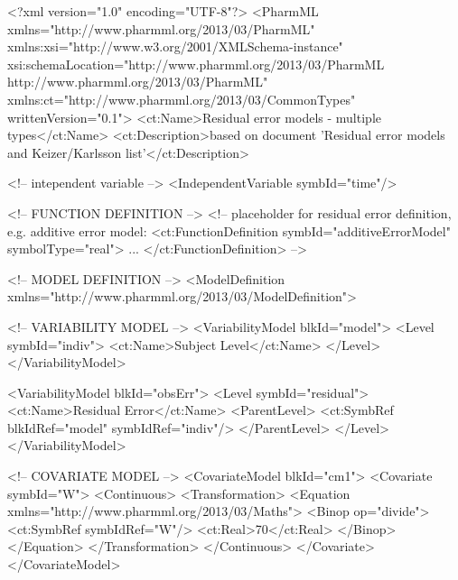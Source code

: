 \documentclass[a4paper,10pt]{article}
\begin{document}
\begin{xmlcode}
<?xml version="1.0" encoding="UTF-8"?>
<PharmML xmlns="http://www.pharmml.org/2013/03/PharmML"
    xmlns:xsi="http://www.w3.org/2001/XMLSchema-instance"
    xsi:schemaLocation="http://www.pharmml.org/2013/03/PharmML http://www.pharmml.org/2013/03/PharmML"
    xmlns:ct="http://www.pharmml.org/2013/03/CommonTypes"
    writtenVersion="0.1">
    <ct:Name>Residual error models - multiple types</ct:Name>
    <ct:Description>based on document 'Residual error models and Keizer/Karlsson list'</ct:Description>

    <!-- intependent variable -->
    <IndependentVariable symbId="time"/>

    <!-- FUNCTION DEFINITION -->
    <!-- placeholder for residual error definition, e.g. additive error model:
        <ct:FunctionDefinition symbId="additiveErrorModel" symbolType="real">
            ...
        </ct:FunctionDefinition>
    -->

    <!-- MODEL DEFINITION -->
    <ModelDefinition xmlns="http://www.pharmml.org/2013/03/ModelDefinition">
        
        <!-- VARIABILITY MODEL -->
        <VariabilityModel blkId="model">
            <Level symbId="indiv">
                <ct:Name>Subject Level</ct:Name>
            </Level>
        </VariabilityModel>
        
        <VariabilityModel blkId="obsErr">
            <Level symbId="residual">
                <ct:Name>Residual Error</ct:Name>
                <ParentLevel>
                    <ct:SymbRef blkIdRef="model" symbIdRef="indiv"/>
                </ParentLevel>
            </Level>
        </VariabilityModel>
        
        <!-- COVARIATE MODEL -->
        <CovariateModel blkId="cm1">
            <Covariate symbId="W">
                <Continuous>
                    <Transformation>
                        <Equation xmlns="http://www.pharmml.org/2013/03/Maths">
                            <Binop op="divide">
                                <ct:SymbRef symbIdRef="W"/>
                                <ct:Real>70</ct:Real>
                            </Binop>
                        </Equation>
                    </Transformation>
                </Continuous>
            </Covariate>
        </CovariateModel>
        

\end{xmlcode}
\end{document}
